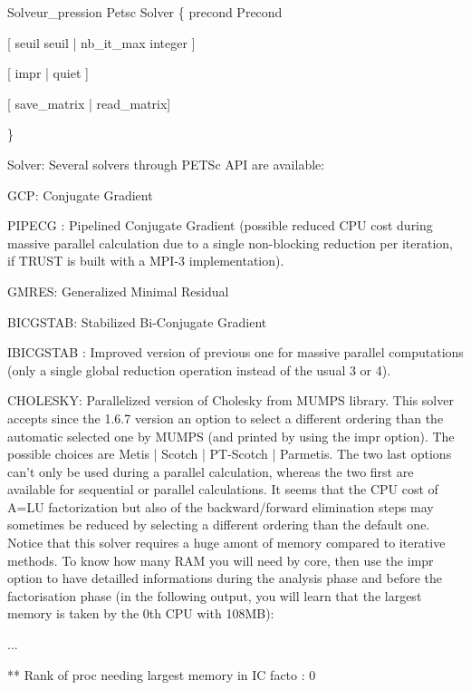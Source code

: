     Solveur\_pression  Petsc  Solver \{ precond Precond  

                                                             [ seuil seuil  | nb\_it\_max integer ]  

                                                             [ impr | quiet ] 

                                                             [ save\_matrix | read\_matrix] 

                                                          \}





Solver: Several solvers through PETSc API are available:

	GCP: Conjugate Gradient

	PIPECG : Pipelined Conjugate Gradient (possible reduced CPU cost during massive parallel calculation due to a single non-blocking reduction per iteration, if TRUST is built with a MPI-3 implementation). 

	GMRES: Generalized Minimal Residual

	BICGSTAB: Stabilized Bi-Conjugate Gradient

	IBICGSTAB : Improved version of previous one for massive parallel computations (only a single global reduction operation instead of the usual 3 or 4).

	CHOLESKY: Parallelized version of Cholesky from MUMPS library. This solver accepts since the 1.6.7 version an option to select a different ordering than the automatic selected one by MUMPS (and printed by using the impr option). The possible choices are Metis | Scotch | PT-Scotch | Parmetis. The two last options can't only be used during a parallel calculation, whereas the two first are available for sequential or parallel calculations. It seems that the CPU cost of A=LU factorization but also of the backward/forward elimination steps may sometimes be reduced by selecting a different ordering than the default one. Notice that this solver requires a huge amont of memory compared to iterative methods. To know how many RAM you will need by core, then use the impr option to have detailled informations during the analysis phase and before the factorisation phase (in the following output, you will learn that the largest memory is taken by the 0th CPU with 108MB):

...

 ** Rank of proc needing largest memory in IC facto        :         0 

